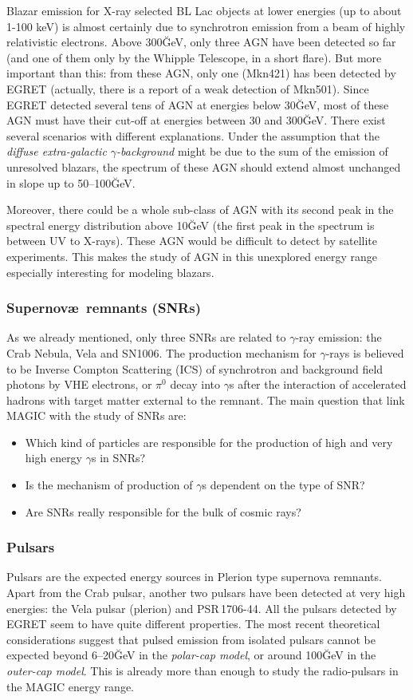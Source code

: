 Blazar emission for X-ray selected BL Lac objects at lower energies
(up to about 1-100 keV) is almost certainly due to synchrotron
emission from a beam of highly relativistic electrons.  Above
300\u{GeV}, only three AGN have been detected so far (and one of them
only by the Whipple Telescope, in a short flare). But more important
than this: from these AGN, only one (Mkn421) has been detected by
EGRET (actually, there is a report of a weak detection of Mkn501).
Since EGRET detected several tens of AGN at energies below 30\u{GeV},
most of these AGN must have their cut-off at energies between 30 and
300\u{GeV}. There exist several scenarios with different explanations.
Under the assumption that the \emph{diffuse extra-galactic
  $\gamma$-background} might be due to the sum of the emission of
unresolved blazars, the spectrum of these AGN should extend almost
unchanged in slope up to 50--100\u{GeV}.

Moreover, there could be a whole sub-class of AGN with its second peak
in the spectral energy distribution above 10\u{GeV} (the first peak in
the spectrum is between UV to X-rays). These AGN would be difficult to
detect by satellite experiments. This makes the study of AGN in this
unexplored energy range especially interesting for modeling blazars.

\subsubsection*{Supernov{\ae}\ remnants (SNRs)}
% 
As we already mentioned, only three SNRs are related to $\gamma$-ray
emission: the Crab Nebula, Vela and SN1006. The production mechanism
for $\gamma$-rays is believed to be Inverse Compton Scattering (ICS)
of synchrotron and background field photons by VHE electrons, or
$\pi^0$ decay into $\gamma$s after the interaction of accelerated
hadrons with target matter external to the remnant. The main question
that link MAGIC with the study of SNRs are:
%
\begin{itemize}
\item Which  kind of particles  are responsible for  the production of
  high and very high energy $\gamma$s in SNRs?
\item Is  the mechanism  of production  of $\gamma$s dependent  on the
  type of SNR?
\item Are SNRs really responsible for the bulk of cosmic rays?
\end{itemize}

\subsubsection*{Pulsars} 
%
Pulsars are the expected energy sources in Plerion type supernova
remnants. Apart from the Crab pulsar, another two pulsars have been
detected at very high energies: the Vela pulsar (plerion) and
PSR\,1706-44. All the pulsars detected by EGRET seem to have quite
different properties. The most recent theoretical considerations
suggest that pulsed emission from isolated pulsars cannot be expected
beyond 6--20\u{GeV} in the \emph{polar-cap model}, or around
100\u{GeV} in the \emph{outer-cap model}.  This is already more than
enough to study the radio-pulsars in the MAGIC energy range.

